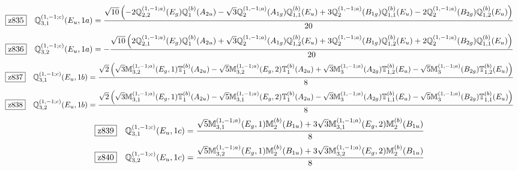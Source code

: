 \documentclass[fleqn,10pt,landscape]{jsarticle}
\begin{document}
\begin{dmath*}
\hspace*{3mm}\fbox{z835}\quad \mathbb{Q}_{3,1}^{(1,-1;c)}(E_{u},1a)=\frac{\sqrt{10} \left(- 2 \mathbb{Q}_{2,2}^{(1,-1;a)}(E_{g}) \mathbb{Q}_{1}^{(b)}(A_{2u}) - \sqrt{3} \mathbb{Q}_{2}^{(1,-1;a)}(A_{1g}) \mathbb{Q}_{1,1}^{(b)}(E_{u}) + 3 \mathbb{Q}_{2}^{(1,-1;a)}(B_{1g}) \mathbb{Q}_{1,1}^{(b)}(E_{u}) - 2 \mathbb{Q}_{2}^{(1,-1;a)}(B_{2g}) \mathbb{Q}_{1,2}^{(b)}(E_{u})\right)}{20}
\end{dmath*}
\begin{dmath*}
\hspace*{3mm}\fbox{z836}\quad \mathbb{Q}_{3,2}^{(1,-1;c)}(E_{u},1a)=- \frac{\sqrt{10} \left(2 \mathbb{Q}_{2,1}^{(1,-1;a)}(E_{g}) \mathbb{Q}_{1}^{(b)}(A_{2u}) + \sqrt{3} \mathbb{Q}_{2}^{(1,-1;a)}(A_{1g}) \mathbb{Q}_{1,2}^{(b)}(E_{u}) + 3 \mathbb{Q}_{2}^{(1,-1;a)}(B_{1g}) \mathbb{Q}_{1,2}^{(b)}(E_{u}) + 2 \mathbb{Q}_{2}^{(1,-1;a)}(B_{2g}) \mathbb{Q}_{1,1}^{(b)}(E_{u})\right)}{20}
\end{dmath*}
\begin{dmath*}
\hspace*{3mm}\fbox{z837}\quad \mathbb{Q}_{3,1}^{(1,-1;c)}(E_{u},1b)=\frac{\sqrt{2} \left(\sqrt{3} \mathbb{M}_{3,2}^{(1,-1;a)}(E_{g},1) \mathbb{T}_{1}^{(b)}(A_{2u}) - \sqrt{5} \mathbb{M}_{3,2}^{(1,-1;a)}(E_{g},2) \mathbb{T}_{1}^{(b)}(A_{2u}) + \sqrt{3} \mathbb{M}_{3}^{(1,-1;a)}(A_{2g}) \mathbb{T}_{1,2}^{(b)}(E_{u}) - \sqrt{5} \mathbb{M}_{3}^{(1,-1;a)}(B_{2g}) \mathbb{T}_{1,2}^{(b)}(E_{u})\right)}{8}
\end{dmath*}
\begin{dmath*}
\hspace*{3mm}\fbox{z838}\quad \mathbb{Q}_{3,2}^{(1,-1;c)}(E_{u},1b)=\frac{\sqrt{2} \left(\sqrt{3} \mathbb{M}_{3,1}^{(1,-1;a)}(E_{g},1) \mathbb{T}_{1}^{(b)}(A_{2u}) - \sqrt{5} \mathbb{M}_{3,1}^{(1,-1;a)}(E_{g},2) \mathbb{T}_{1}^{(b)}(A_{2u}) - \sqrt{3} \mathbb{M}_{3}^{(1,-1;a)}(A_{2g}) \mathbb{T}_{1,1}^{(b)}(E_{u}) - \sqrt{5} \mathbb{M}_{3}^{(1,-1;a)}(B_{2g}) \mathbb{T}_{1,1}^{(b)}(E_{u})\right)}{8}
\end{dmath*}
\begin{dmath*}
\hspace*{3mm}\fbox{z839}\quad \mathbb{Q}_{3,1}^{(1,-1;c)}(E_{u},1c)=\frac{\sqrt{5} \mathbb{M}_{3,1}^{(1,-1;a)}(E_{g},1) \mathbb{M}_{2}^{(b)}(B_{1u}) + 3 \sqrt{3} \mathbb{M}_{3,1}^{(1,-1;a)}(E_{g},2) \mathbb{M}_{2}^{(b)}(B_{1u})}{8}
\end{dmath*}
\begin{dmath*}
\hspace*{3mm}\fbox{z840}\quad \mathbb{Q}_{3,2}^{(1,-1;c)}(E_{u},1c)=\frac{\sqrt{5} \mathbb{M}_{3,2}^{(1,-1;a)}(E_{g},1) \mathbb{M}_{2}^{(b)}(B_{1u}) + 3 \sqrt{3} \mathbb{M}_{3,2}^{(1,-1;a)}(E_{g},2) \mathbb{M}_{2}^{(b)}(B_{1u})}{8}
\end{dmath*}
\end{document}
